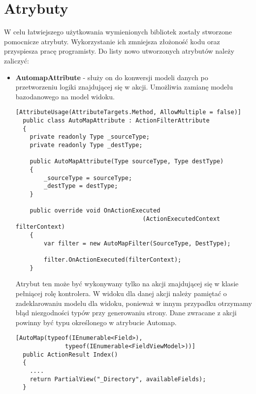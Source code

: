 \section{Atrybuty}

W celu łatwiejszego użytkowania wymienionych bibliotek zostały stworzone pomocnicze atrybuty. Wykorzystanie ich zmniejsza złożoność kodu oraz przyspiesza pracę programisty. Do listy nowo utworzonych atrybutów należy zaliczyć:
\begin{itemize}
  \item \textbf{AutomapAttribute} - służy on do konwersji modeli danych po przetworzeniu logiki znajdującej się w akcji. Umożliwia zamianę modelu bazodanowego na model widoku.
  \\
  \begin{lstlisting}[caption=Kod atrybutu Automap]
  [AttributeUsage(AttributeTargets.Method, AllowMultiple = false)]
  public class AutoMapAttribute : ActionFilterAttribute
  {
  	private readonly Type _sourceType;
  	private readonly Type _destType;
  	
  	public AutoMapAttribute(Type sourceType, Type destType)
  	{
  		_sourceType = sourceType;
  		_destType = destType;
  	}
  	
  	public override void OnActionExecuted
  									(ActionExecutedContext filterContext)
  	{
  		var filter = new AutoMapFilter(SourceType, DestType);
  		
  		filter.OnActionExecuted(filterContext);
  	}
  \end{lstlisting}
  
  Atrybut ten może być wykonywany tylko na akcji znajdującej się w klasie pełniącej rolę kontrolera. W widoku dla danej akcji należy pamiętać o zadeklarowaniu modelu dla widoku, ponieważ w innym przypadku otrzymamy błąd niezgodności typów przy generowaniu strony. Dane zwracane z akcji powinny być typu określonego w atrybucie Automap.
  \\
  \begin{lstlisting}[caption=Wykorzystanie atrybutu AutoMap]
  [AutoMap(typeof(IEnumerable<Field>),
			  typeof(IEnumerable<FieldViewModel>))]
  public ActionResult Index()
  {
  	....
  	return PartialView("_Directory", availableFields);
  }
  \end{lstlisting}
  

\end{itemize}
